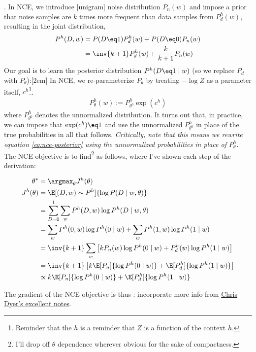 \documentclass[11pt]{article}
\newcommand\myspace[1][]{\vspace{#1\bigskipamount}}
\newcommand\p{\Needspace{10\baselineskip} \noindent}
\newcommand\bluesec[1]{\myspace \p \blue{#1}}
\begin{document}
\bluesec{NCE}. In NCE, we introduce [unigram] noise distribution $P_n(w)$ and impose a prior that noise samples are $k$ times more frequent than data samples from $P_d^h(w)$, resulting in the joint distribution,
\begin{align}
	P^h(D, w) 
		&= P(D \eq 1) P_d^h(w) + P(D \eq 0) P_n(w) \\
		&= \inv{k+1} P_d^h(w) + \frac{k}{k+1} P_n(w) 
\end{align}
Our goal is to learn the posterior distribution $P^h(D \eq 1 \mid w)$ (so we replace $P_d$ with $P_{\theta}$):[2em]
In NCE, we re-parameterize $P_{\theta}$ by treating $-\log Z$ as a parameter itself, $c^h$\footnote{Reminder that the $h$ is a reminder that $Z$ is a function of the context $h$.}. 
\begin{align}
	P_{\theta}^h(w) := P_{\theta^0}^h \exp(c^h)
\end{align}
where $P_{\theta^0}^h$ denotes the unnormalized distribution. It turns out that, in practice, we can impose that $\exp(c^h) \eq 1$ and use the unnormalized $P^h_{\theta^0}$ in place of the true probabilities in all that follows. \textit{Critically, note that this means we rewrite equation \ref{eq:nce-posterior} using the unnormalized probabilities in place of $P_{\theta}^h$}. The NCE objective is to find\footnote{I'll drop off $\theta$ dependence wherever obvious for the sake of compactness.} as follows, where I've shown each step of the derivation:
\begin{small}
\begin{align}
	\theta^* 
		&= \argmax_{\theta} J^h(\theta) \\
	J^h(\theta)
		&= \E[(D,w) \sim P^h]{\log P(D \mid w, \theta)} \\
		&= \sum_{D=0}^{1} \sum_w P^h(D, w) \log P^h(D \mid w, \theta) \\
		&= \sum_w  P^h(0, w) \log P^h(0 \mid w)   + \sum_w  P^h(1, w) \log P^h(1 \mid w) \\
		&= \inv{k+1} \sum_w \left[
			k P_n(w) \log P^h(0 \mid w) 
			+ P_d^h(w) \log P^h(1 \mid w)
		\right] \\
		&= \inv{k+1} \left[
			k \E[P_n]{\log P^h(0 \mid w)}
			+ \E[P^h_d]{\log P^h(1 \mid w)}
		\right] \\
		&\propto k \E[P_n]{\log P^h(0 \mid w)}
		+ \E[P^h_d]{\log P^h(1 \mid w)}
\end{align}
\end{small}
The gradient of the NCE objective is thus
: incorporate more info from \href{http://demo.clab.cs.cmu.edu/cdyer/nce_notes.pdf}{Chris Dyer's excellent notes}.
\end{document}
